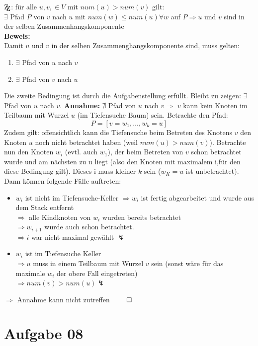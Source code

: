 \documentclass[10pt,a4paper]{article}
\newcommand{\zz}{\mathrm{Z\kern-.3em\raise-0.5ex\hbox{Z}}}
\begin{document}
	$\zz$: für alle $u,v, \in V$ mit $num(u) > num(v)$ gilt:\\
	$\exists$ Pfad $P$ von $v$ nach $u$ mit $num(w) \leq num(u) \forall w$
	auf $P \Rightarrow u$ und $v$ sind in der selben Zusammenhangskomponente
	\\
	\textbf{Beweis:}\\
	Damit $u$ und $v$ in der selben Zusammenghangskomponente sind, muss gelten:
	\begin{enumerate}[label={\alph*.}]
		\item
			$\exists$ Pfad von $u$ nach $v$
		\item
			$\exists$ Pfad von $v$ nach $u$
	\end{enumerate}
	Die zweite Bedingung ist durch die Aufgabenstellung erfüllt. Bleibt zu zeigen:
	$\exists$ Pfad von $u$ nach $v$. \textbf{Annahme:} $\nexists$
	Pfad von $u$ nach $v \Rightarrow$ $v$ kann kein Knoten im Teilbaum mit
	Wurzel $u$ (im Tiefensuche Baum) sein. Betrachte den Pfad:
	$$
		P = [v = w_1, \ldots, w_k = u]
	$$
	Zudem gilt: offensichtlich kann die Tiefensuche beim Betreten des Knotens $v$
	den Knoten $u$ noch nicht betrachtet haben (weil $num(u) > num(v)$).
	Betrachte nun den Knoten $w_i$ (evtl. auch $w_1$), der beim Betreten von $v$ schon betrachtet
	wurde und am nächsten zu u liegt (also den Knoten mit maximalem i,für den diese
	Bedingung gilt). Dieses i muss kleiner $k$ sein ($w_K = u$ ist unbetrachtet).
	Dann können folgende Fälle auftreten:
	\begin{itemize}
		\item $w_i$ ist nicht im Tiefensuche-Keller
			$\Rightarrow w_i$ ist fertig abgearbeitet und wurde aus
			dem Stack entfernt \\
			$\Rightarrow $ alle Kindknoten von $w_i$ wurden bereits betrachtet\\
			$\Rightarrow w_{i+1}$ wurde auch schon betrachtet.\\
			$\Rightarrow i$ war nicht maximal gewählt $\lightning$
		\item $w_i$ ist im Tiefensuche Keller \\
			$\Rightarrow u$ muss in einem Teilbaum mit Wurzel $v$ sein (sonst wäre für das maximale $w_i$
				der obere Fall eingetreten)\\
			$\Rightarrow num(v) > num(u) \lightning$
	\end{itemize}
	$\Rightarrow$ Annahme kann nicht zutreffen \hfill $\qed$

\section*{Aufgabe 08}
\end{document}
